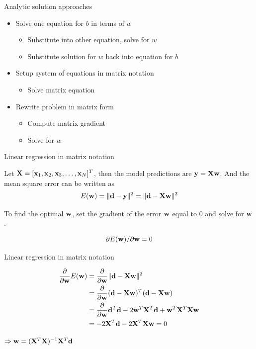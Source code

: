 \documentclass[notes]{beamer}
\providecommand{\tightlist}{%
  \setlength{\itemsep}{0pt}\setlength{\parskip}{0pt}}
\begin{document}
\begin{frame}{Analytic solution approaches}

\begin{itemize}
\tightlist
\item
  Solve one equation for \(b\) in terms of \(w\)

  \begin{itemize}
  \tightlist
  \item
    Substitute into other equation, solve for \(w\)
  \item
    Substitute solution for \(w\) back into equation for \(b\)
  \end{itemize}
\item
  Setup system of equations in matrix notation

  \begin{itemize}
  \tightlist
  \item
    Solve matrix equation
  \end{itemize}
\item
  Rewrite problem in matrix form

  \begin{itemize}
  \tightlist
  \item
    Compute matrix gradient
  \item
    Solve for \(w\)
  \end{itemize}
\end{itemize}

\end{frame}

\begin{frame}{Linear regression in matrix notation}

Let \(\mathbf{X} = [\mathbf{x}_1 ,\mathbf{x}_2 ,\mathbf{x}_3 ,\dots ,\mathbf{x}_N]^T\), then the model
predictions are \(\mathbf{y}=\mathbf{X} \mathbf{w}\). And the mean square error can be
written as \[E(\mathbf{w})=\|\mathbf{d} - \mathbf{y}\|^2 = \|\mathbf{d} -\mathbf{X} \mathbf{w}\|^2\]

To find the optimal \(\mathbf{w}\), set the gradient of the error \wrt \(\mathbf{w}\)
equal to 0 and solve for \(\mathbf{w}\).

\[\partial E(\mathbf{w}) / \partial \mathbf{w}=0\]

\end{frame}

\begin{frame}{Linear regression in matrix notation}

\begin{equation*}
\begin{aligned}
\frac{\partial}{\partial \mathbf{w}} E(\mathbf{w}) & = \frac{\partial}{\partial \mathbf{w}} \| \mathbf{d} - \mathbf{X} \mathbf{w} \|^2 \\  
&= \frac{\partial}{\partial \mathbf{w}} (\mathbf{d} -\mathbf{X} \mathbf{w})^T(\mathbf{d} -\mathbf{X} \mathbf{w}) \\ 
&= \frac{\partial}{\partial \mathbf{w}} \mathbf{d}^T \mathbf{d} -2 \mathbf{w}^T \mathbf{X}^T \mathbf{d} + \mathbf{w}^T \mathbf{X}^T \mathbf{X} \mathbf{w} \\ 
&= -2 \mathbf{X}^T \mathbf{d} -2 \mathbf{X}^T \mathbf{X} \mathbf{w} = 0
\end{aligned}
\end{equation*}

\(\Rightarrow \mathbf{w} = (\mathbf{X} ^T \mathbf{X})^{-1} \mathbf{X}^T \mathbf{d}\)

\end{frame}
\end{document}
